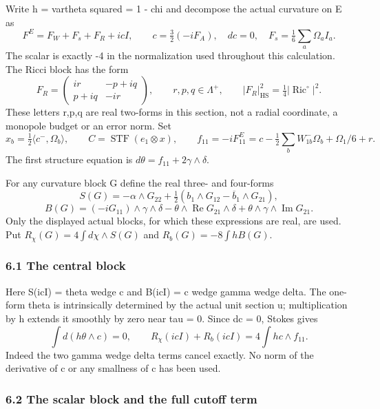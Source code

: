 \documentclass[
  10pt,
]{article}
\begin{document}
Write h = vartheta squared = 1 - chi and decompose the actual curvature
on E as \[
 F^E=F_W+F_s+F_R+i c I,\qquad
 c=\tfrac32(-iF_A),\quad dc=0,\quad
 F_s=\tfrac16\sum_a\Omega_a I_a.
\] The scalar is exactly -4 in the normalization used throughout this
calculation. The Ricci block has the form \[
 F_R=\begin{pmatrix}ir&-p+iq\\p+iq&-ir\end{pmatrix},
 \qquad r,p,q\in\Lambda^+,
 \qquad |F_R|_{\mathrm{HS}}^2=\tfrac14|\operatorname{Ric}^{\circ}|^2.
\] These letters r,p,q are real two-forms in this section, not a radial
coordinate, a monopole budget or an error norm. Set \[
 x_b=\tfrac12\langle c^-,\Omega_b\rangle,\qquad
 C=\operatorname{STF}(e_1\otimes x),\qquad
 f_{11}=-iF^E_{11}
   =c-\tfrac12\sum_bW_{1b}^-\Omega_b+\Omega_1/6+r.
\] The first structure equation is
\(d\theta=f_{11}+2\gamma\wedge\delta\).

For any curvature block G define the real three- and four-forms \[
 S(G)=-\alpha\wedge G_{22}
       +\tfrac12(b_1\wedge G_{12}-\overline b_1\wedge G_{21}),
\] \[
 B(G)=(-iG_{11})\wedge\gamma\wedge\delta
       -\theta\wedge\operatorname{Re}G_{21}\wedge\delta
       +\theta\wedge\gamma\wedge\operatorname{Im}G_{21}.
\] Only the displayed actual blocks, for which these expressions are
real, are used. Put \(R_\chi(G)=4\int d\chi\wedge S(G)\) and
\(R_b(G)=-8\int hB(G)\).

\hypertarget{the-central-block}{%
\subsubsection{6.1 The central block}\label{the-central-block}}

Here S(icI) = theta wedge c and B(icI) = c wedge gamma wedge delta. The
one-form theta is intrinsically determined by the actual unit section u;
multiplication by h extends it smoothly by zero near tau = 0. Since dc =
0, Stokes gives \[
 \int d(h\theta\wedge c)=0,
 \qquad
 \boxed{R_\chi(icI)+R_b(icI)=4\int h c\wedge f_{11}.}     \tag{6.1}
\] Indeed the two gamma wedge delta terms cancel exactly. No norm of the
derivative of c or any smallness of c has been used.

\hypertarget{the-scalar-block-and-the-full-cutoff-term}{%
\subsubsection{6.2 The scalar block and the full cutoff
term}\label{the-scalar-block-and-the-full-cutoff-term}}
\end{document}
